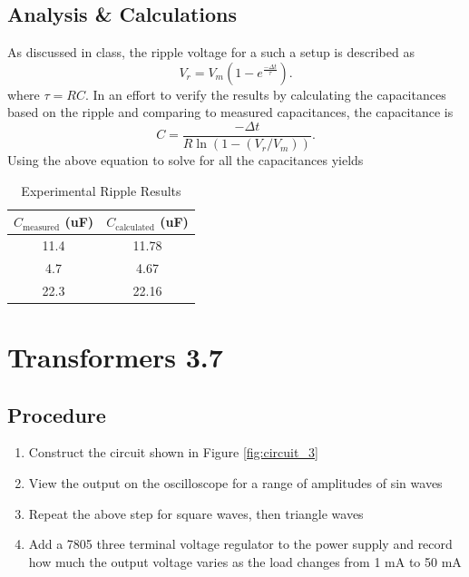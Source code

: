 \documentclass[12pt,letterpaper]{report}
\begin{document}


\subsection*{Analysis \& Calculations}
As discussed in class, the ripple voltage for a such a setup is described as
$$
V_r = V_m(1-e^{\frac{-\Delta t}{\tau}}).
$$
where $ \tau = RC $. In an effort to verify the results by calculating the capacitances based on the ripple and comparing to measured capacitances, the capacitance is
$$
C = \frac{-\Delta t}{R\ln (1-(V_r/V_m))}.
$$
Using the above equation to solve for all the capacitances yields

\begin{table}[ht]
\caption{Experimental Ripple Results} %
\centering 
    \begin{tabular}{| c | c |}
    \hline  
    $C_{\text{measured}}$ (uF) & $C_{\text{calculated}}$ (uF)\\
    \hline
    11.4 & 11.78 \\
    4.7 & 4.67 \\
    22.3 & 22.16 \\
    \hline
    \end{tabular}
    \label{table:c_comparisons}
\end{table}

\section*{Transformers 3.7}
\subsection*{Procedure}

\begin{enumerate}
\item Construct the circuit shown in Figure \ref{fig:circuit_3}
\item View the output on the oscilloscope for a range of amplitudes of sin waves
\item Repeat the above step for square waves, then triangle waves
\item Add a 7805 three terminal voltage regulator to the power supply and record how much the  output voltage varies as the load changes from 1 mA to 50 mA
\end{enumerate}
\end{document}
